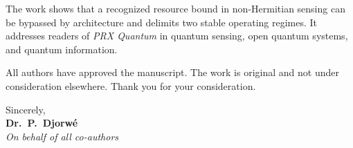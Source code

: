 \documentclass[11pt,a4paper]{article}
\begin{document}
The work shows that a recognized resource bound in non-Hermitian sensing can be bypassed by architecture and delimits two stable operating regimes. It addresses readers of \textit{PRX Quantum} in quantum sensing, open quantum systems, and quantum information.

All authors have approved the manuscript. The work is original and not under consideration elsewhere. Thank you for your consideration.

\vspace{5mm}
\noindent Sincerely,\\[2mm]
\textbf{Dr.~P.~Djorw\'e}\\
\textit{On behalf of all co-authors}
\end{document}
